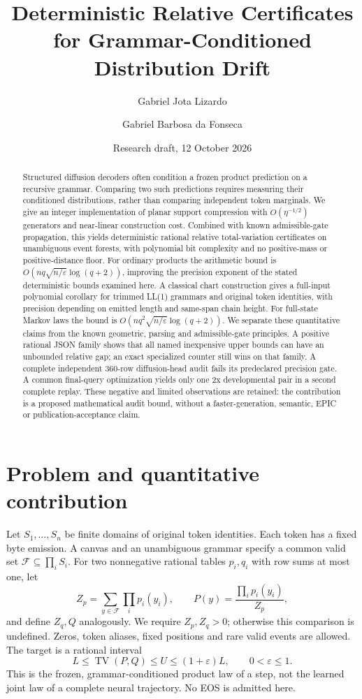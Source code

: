 \documentclass[11pt]{article}
\title{Deterministic Relative Certificates for\newline
Grammar-Conditioned Distribution Drift}
\author{Gabriel Jota Lizardo\and Gabriel Barbosa da Fonseca}
\date{Research draft, 12 October 2026}
\newcommand{\TV}{\operatorname{TV}}
\begin{document}
\maketitle
\begin{abstract}
Structured diffusion decoders often condition a frozen product prediction on
a recursive grammar. Comparing two such predictions requires measuring their
conditioned distributions, rather than comparing independent token marginals.
We give an integer implementation of planar support compression with
$O(\eta^{-1/2})$ generators and near-linear construction cost. Combined with
known admissible-gate propagation, this yields deterministic rational relative
total-variation certificates on unambiguous event forests, with polynomial
bit complexity and no positive-mass or positive-distance floor. For ordinary
products the arithmetic bound is
$O(nq\sqrt{n/\varepsilon}\log(q+2))$, improving the precision
exponent of the stated deterministic bounds examined here. A classical chart construction gives a full-input polynomial corollary for
trimmed LL(1) grammars and original token identities, with precision depending
on emitted length and same-span chain height. For full-state Markov laws the
bound is $O(nq^2\sqrt{n/\varepsilon}\log(q+2))$. We separate these quantitative
claims from the known geometric, parsing and admissible-gate principles.
A positive rational JSON family shows that all named inexpensive upper bounds
can have an unbounded relative gap; an exact specialized counter still wins
on that family. A complete independent 360-row diffusion-head audit fails its
predeclared precision gate. A common final-query optimization yields only one
2x developmental pair in a second complete replay. These negative and limited
observations are retained: the contribution is a proposed mathematical audit
bound, without a faster-generation, semantic, EPIC or publication-acceptance
claim.
\end{abstract}

\section{Problem and quantitative contribution}
Let $S_1,\ldots,S_n$ be finite domains of original token identities. Each token
has a fixed byte emission. A canvas and an unambiguous grammar specify a
common valid set $\mathcal F\subseteq\prod_i S_i$. For two nonnegative rational
tables $p_i,q_i$ with row sums at most one, let
\[
 Z_p=\sum_{y\in\mathcal F}\prod_i p_i(y_i),\qquad
 P(y)=\frac{\prod_i p_i(y_i)}{Z_p},
\]
and define $Z_q,Q$ analogously. We require $Z_p,Z_q>0$; otherwise this comparison
is undefined. Zeros, token aliases, fixed positions and rare valid events are
allowed. The target is a rational interval
\begin{equation}\label{eq:target}
 L\leq\TV(P,Q)\leq U\leq(1+\varepsilon)L,
 \qquad 0<\varepsilon\leq1.
\end{equation}
This is the frozen, grammar-conditioned product law of a step, not the
learned joint law of a complete neural trajectory. No EOS is admitted here.
\end{document}
